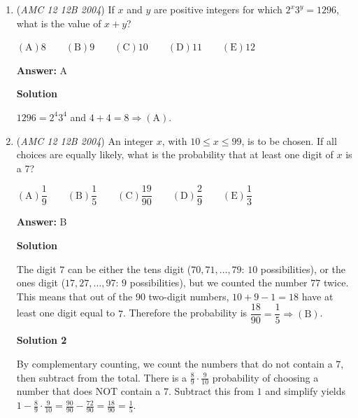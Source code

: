 \begin{enumerate}
We first minimize $d$ as $0$, since is it subtracted and is independent from the rest. Then we are left with $a$, $b$, $c$ is from the set ${1,2,3}$. Then after some logical tries we can get $1\cdot3^2-0=\boxed{\mathrm{(D)}\ 9}$ is the largest.

 


	\item (\textit{AMC 12 12B 2004}) If $x$ and $y$ are positive integers for which $2^x3^y=1296$, what is the value of $x+y$?


 $(\mathrm {A}) 8\qquad (\mathrm {B}) 9 \qquad (\mathrm {C}) 10 \qquad (\mathrm {D}) 11 \qquad (\mathrm {E}) 12$

 \textbf{Answer: }A



\textbf{Solution}

$1296 = 2^4 3^4$ and $4+4=\boxed{8} \Longrightarrow \mathrm{(A)}$.

 


	\item (\textit{AMC 12 12B 2004}) An integer $x$, with $10\leq x\leq 99$, is to be chosen. If all choices are equally likely, what is the probability that at least one digit of $x$ is a 7?


 $(\mathrm {A}) \dfrac{1}{9} \qquad (\mathrm {B}) \dfrac{1}{5} \qquad (\mathrm {C}) \dfrac{19}{90} \qquad (\mathrm {D}) \dfrac{2}{9} \qquad (\mathrm {E}) \dfrac{1}{3}$

 \textbf{Answer: }B



\textbf{Solution}

The digit $7$ can be either the tens digit ($70, 71, \dots, 79$: $10$ possibilities), or the ones digit ($17, 27, \dots, 97$: $9$ possibilities), but we counted the number $77$ twice. This means that out of the $90$ two-digit numbers, $10+9-1=18$ have at least one digit equal to $7$. Therefore the probability is $\dfrac{18}{90} = \boxed{\dfrac{1}{5}} \Longrightarrow \mathrm{(B)}$.

 



\textbf{Solution 2}

By complementary counting, we count the numbers that do not contain a $7$, then subtract from the total. There is a $\frac{8}{9}\cdot\frac{9}{10}$ probability of choosing a number that does NOT contain a $7$. Subtract this from $1$ and simplify yields $1 - \frac{8}{9}\cdot\frac{9}{10} = \frac{90}{90} - \frac{72}{90} = \frac{18}{90} = \frac{1}{5}$.


\end{enumerate}
